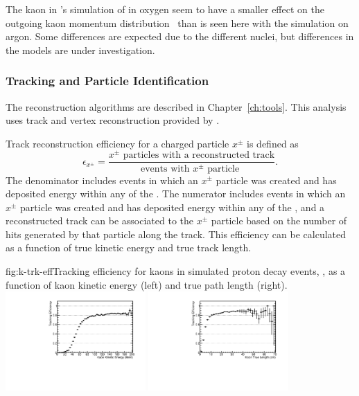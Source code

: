 The kaon  in \superk's simulation of \ptoknubar in oxygen seem to have a smaller effect on the outgoing kaon momentum distribution~\cite{Abe:2014mwa} than is seen here with the  simulation on argon.  Some differences are expected due to the different nuclei, but differences in the  models are under investigation.

\subsubsection{Tracking and Particle Identification}
\label{sec:event-reconstruction}

The  reconstruction algorithms are described in Chapter~\ref{ch:tools}.  This analysis uses \threed track and vertex reconstruction provided by .

Track reconstruction efficiency for a charged particle $x^{\pm}$ is defined as 
\begin{equation}
\epsilon_{x^{\pm}} = \frac{\mbox{$x^{\pm}$ particles with a reconstructed track}}{\mbox{events with $x^{\pm}$ particle }}.
\end{equation}
The denominator includes events in which an $x^{\pm}$ particle was created and has deposited energy within any of the .  The numerator includes events in which an $x^{\pm}$ particle was created and has deposited energy within any of the , and a reconstructed track can be associated to the $x^{\pm}$ particle based on the number of hits generated by that particle along the track. This efficiency can be calculated as a function of true kinetic energy and true track length.

\begin{dunefigure}{fig:k-trk-eff}{Tracking efficiency for kaons in simulated proton decay events, \ptoknubar, as a function of kaon kinetic energy (left) and true path length (right).}
\includegraphics[width=0.4\textwidth]{graphics/k-trk-eff-KE.pdf}
\includegraphics[width=0.4\textwidth]{graphics/k-trk-eff-length.pdf}
\end{dunefigure}

